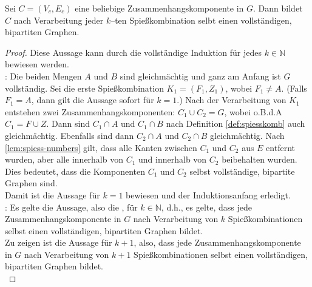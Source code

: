 \begin{lemma}\label{lem:komponente-complete}
Sei $C = (V_c, E_c)$ eine beliebige Zusammenhangskomponente in $G$. 
Dann bildet $C$ nach Verarbeitung jeder $k$--ten Spießkombination
selbt einen vollständigen, bipartiten Graphen.
\end{lemma}

\begin{proof}
Diese Aussage kann durch die vollständige Induktion für jedes $k \in \mathbb{N}$ bewiesen werden.\\

\noindent
{}: 
Die beiden Mengen $A$ und $B$ sind gleichmächtig und ganz am Anfang ist $G$ vollständig.
Sei die erste Spießkombination $K_1 = (F_1, Z_1)$, wobei $F_1 \neq A$. (Falls $F_1 = A$,
dann gilt die Aussage sofort für $k = 1$.)
Nach der Verarbeitung von $K_1$ 
entstehen zwei Zusammenhangskomponenten: $C_1 \cup C_2 = G$, wobei o.B.d.A $C_1 = F \cup Z$.
Dann sind $C_1 \cap A$ und $C_1 \cap B$ nach Definition \ref{def:spiesskomb} auch gleichmächtig. 
Ebenfalls sind dann $C_2 \cap A$ und $C_2 \cap B$ gleichmächtig.
Nach \ref{lem:spiess-numbers} gilt, dass alle Kanten zwischen $C_1$ und $C_2$
aus $E$ entfernt wurden, aber alle innerhalb von $C_1$ und innerhalb von $C_2$
beibehalten wurden.
Dies bedeutet, dass die Komponenten $C_1$ und $C_2$ selbst vollständige, bipartite Graphen sind.\\
Damit ist die Aussage für $k = 1$ bewiesen und der Induktionsanfang erledigt.\\

\noindent
{}: Es gelte die Aussage, also die ,
für $k \in \mathbb{N}$, d.h., es gelte,
dass jede Zusammenhangskomponente in $G$ nach Verarbeitung von $k$ Spießkombinationen selbst
einen vollständigen, bipartiten Graphen bildet.\\

Zu zeigen ist die Aussage für $k + 1$, also, dass jede Zusammenhangskomponente in $G$ nach Verarbeitung
von $k + 1$ Spießkombinationen selbst einen vollständigen, bipartiten Graphen bildet.\\


\end{proof}
